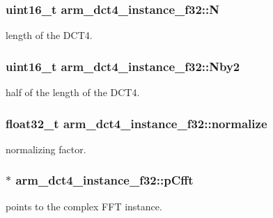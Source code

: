 \subsubsection[{\texorpdfstring{N}{N}}]{\setlength{\rightskip}{0pt plus 5cm}uint16\+\_\+t arm\+\_\+dct4\+\_\+instance\+\_\+f32\+::N}\hypertarget{structarm__dct4__instance__f32_a262b29a51c371b46efc89120e31ccf37}{}\label{structarm__dct4__instance__f32_a262b29a51c371b46efc89120e31ccf37}
length of the D\+C\+T4. 
\subsubsection[{\texorpdfstring{Nby2}{Nby2}}]{\setlength{\rightskip}{0pt plus 5cm}uint16\+\_\+t arm\+\_\+dct4\+\_\+instance\+\_\+f32\+::\+Nby2}\hypertarget{structarm__dct4__instance__f32_adb1ef2739ddbe62e5cdadc47455a4147}{}\label{structarm__dct4__instance__f32_adb1ef2739ddbe62e5cdadc47455a4147}
half of the length of the D\+C\+T4. 
\subsubsection[{\texorpdfstring{normalize}{normalize}}]{\setlength{\rightskip}{0pt plus 5cm}float32\+\_\+t arm\+\_\+dct4\+\_\+instance\+\_\+f32\+::normalize}\hypertarget{structarm__dct4__instance__f32_a61ce8c967b2e998a9c0041cca73cdef8}{}\label{structarm__dct4__instance__f32_a61ce8c967b2e998a9c0041cca73cdef8}
normalizing factor. 
\subsubsection[{\texorpdfstring{p\+Cfft}{pCfft}}]{$\ast$ arm\+\_\+dct4\+\_\+instance\+\_\+f32\+::p\+Cfft}\hypertarget{structarm__dct4__instance__f32_a018f7860b6e070af533fb7d76c7cdc32}{}\label{structarm__dct4__instance__f32_a018f7860b6e070af533fb7d76c7cdc32}
points to the complex F\+FT instance. 
